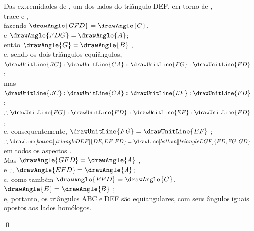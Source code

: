 \documentclass[booklanguage=brazilian]{byrnebook}
\begin{document}
\begin{center}
Das extremidades de , um dos lados do triângulo DEF, em torno de ,\\
trace  e ,\\
fazendo $\drawAngle{GFD} = \drawAngle{C}$,\\
e $\drawAngle{FDG} = \drawAngle{A}$;\\
então $\drawAngle{G} = \drawAngle{B}$ ,\\
e, sendo os dois triângulos equiângulos,\\
$\drawUnitLine{BC} : \drawUnitLine{CA} :: \drawUnitLine{FG} : \drawUnitLine{FD}$ ;\\
mas $\drawUnitLine{BC} : \drawUnitLine{CA} :: \drawUnitLine{EF} : \drawUnitLine{FD}$ \byref{\hypref};\\
$\therefore \drawUnitLine{FG} : \drawUnitLine{FD} :: \drawUnitLine{EF} : \drawUnitLine{FD}$ ,\\
e, consequentemente, $\drawUnitLine{FG} = \drawUnitLine{EF}$ ;\\
$\therefore \drawLine[bottom][triangleDEF]{DE,EF,FD} = \drawLine[bottom][triangleDGF]{FD,FG,GD}$ em todos os aspectos .\\
Mas $\drawAngle{GFD} = \drawAngle{A}$ \byref{\constref},\\
e $\therefore \drawAngle{EFD} = \drawAngle{A}$;\\
e, como também $\drawAngle{EFD} = \drawAngle{C}$,\\
$\drawAngle{E} = \drawAngle{B}$ ;\\
e, portanto, os triângulos ABC e DEF são equiangulares, com seus ângulos iguais opostos aos lados homólogos.
\end{center}

\qed
\end{document}
